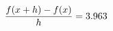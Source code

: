 \documentclass[preview]{standalone}
\begin{document}
\begin{align*}
\special{dvisvgm:raw <g id='unique000'>}\frac{f(x+h)-f(x)}{h} = 3.963\special{dvisvgm:raw </g>}
\end{align*}
\end{document}
